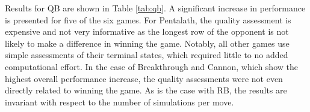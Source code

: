 \documentclass{ecai2014}
\begin{document}
Results for QB are shown in Table \ref{tab:qb}. A significant increase in performance is presented for five of the six games. For Pentalath, the quality assessment is expensive and not very informative as the longest row of the opponent is not likely to make a difference in winning the game. Notably, all other games use simple assessments of their terminal states, which required little to no added computational effort. In the case of Breakthrough and Cannon, which show the highest overall performance increase, the quality assessments were not even directly related to winning the game. As is the case with RB, the results are invariant with respect to the number of simulations per move.

\begin{table}
{\caption{Qualitative Bonus and Relative Bonus combined using different search times, 5000 games} \label{tab:qb}}
\tabcolsep=0.15cm
\begin{center}
\end{center}
\end{table}

\end{document}
